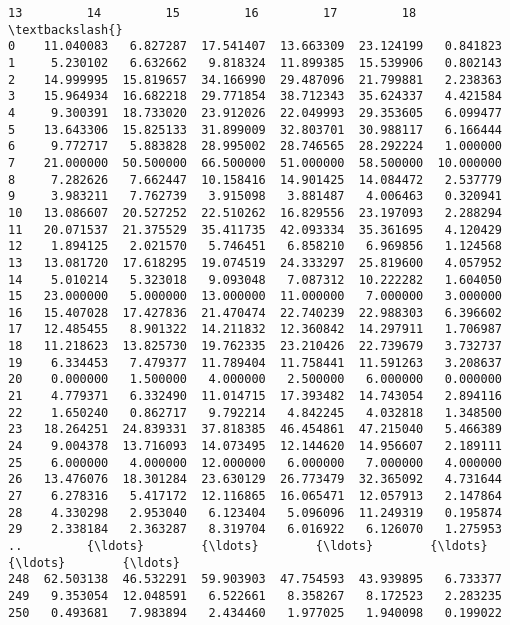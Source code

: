 \documentclass[11pt]{article}
\begin{document}
\begin{Verbatim}[commandchars=\\\{\}]
            13         14         15         16         17         18  \textbackslash{}
0    11.040083   6.827287  17.541407  13.663309  23.124199   0.841823   
1     5.230102   6.632662   9.818324  11.899385  15.539906   0.802143   
2    14.999995  15.819657  34.166990  29.487096  21.799881   2.238363   
3    15.964934  16.682218  29.771854  38.712343  35.624337   4.421584   
4     9.300391  18.733020  23.912026  22.049993  29.353605   6.099477   
5    13.643306  15.825133  31.899009  32.803701  30.988117   6.166444   
6     9.772717   5.883828  28.995002  28.746565  28.292224   1.000000   
7    21.000000  50.500000  66.500000  51.000000  58.500000  10.000000   
8     7.282626   7.662447  10.158416  14.901425  14.084472   2.537779   
9     3.983211   7.762739   3.915098   3.881487   4.006463   0.320941   
10   13.086607  20.527252  22.510262  16.829556  23.197093   2.288294   
11   20.071537  21.375529  35.411735  42.093334  35.361695   4.120429   
12    1.894125   2.021570   5.746451   6.858210   6.969856   1.124568   
13   13.081720  17.618295  19.074519  24.333297  25.819600   4.057952   
14    5.010214   5.323018   9.093048   7.087312  10.222282   1.604050   
15   23.000000   5.000000  13.000000  11.000000   7.000000   3.000000   
16   15.407028  17.427836  21.470474  22.740239  22.988303   6.396602   
17   12.485455   8.901322  14.211832  12.360842  14.297911   1.706987   
18   11.218623  13.825730  19.762335  23.210426  22.739679   3.732737   
19    6.334453   7.479377  11.789404  11.758441  11.591263   3.208637   
20    0.000000   1.500000   4.000000   2.500000   6.000000   0.000000   
21    4.779371   6.332490  11.014715  17.393482  14.743054   2.894116   
22    1.650240   0.862717   9.792214   4.842245   4.032818   1.348500   
23   18.264251  24.839331  37.818385  46.454861  47.215040   5.466389   
24    9.004378  13.716093  14.073495  12.144620  14.956607   2.189111   
25    6.000000   4.000000  12.000000   6.000000   7.000000   4.000000   
26   13.476076  18.301284  23.630129  26.773479  32.365092   4.731644   
27    6.278316   5.417172  12.116865  16.065471  12.057913   2.147864   
28    4.330298   2.953040   6.123404   5.096096  11.249319   0.195874   
29    2.338184   2.363287   8.319704   6.016922   6.126070   1.275953   
..         {\ldots}        {\ldots}        {\ldots}        {\ldots}        {\ldots}        {\ldots}   
248  62.503138  46.532291  59.903903  47.754593  43.939895   6.733377   
249   9.353054  12.048591   6.522661   8.358267   8.172523   2.283235   
250   0.493681   7.983894   2.434460   1.977025   1.940098   0.199022   

\end{Verbatim}
\end{document}
